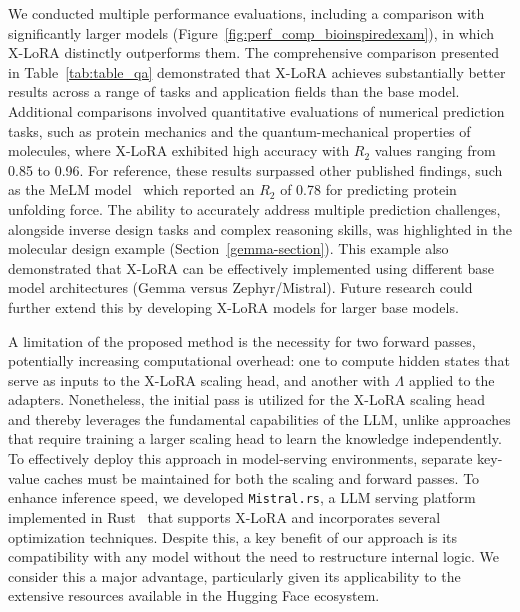 We conducted multiple performance evaluations, including a comparison with significantly larger models (Figure~\ref{fig:perf_comp_bioinspiredexam}), in which X-LoRA distinctly outperforms them. The comprehensive comparison presented in Table~\ref{tab:table_qa} demonstrated that X-LoRA achieves substantially better results across a range of tasks and application fields than the base model. Additional comparisons involved quantitative evaluations of numerical prediction tasks, such as protein mechanics and the quantum-mechanical properties of molecules, where X-LoRA exhibited high accuracy with $R_2$ values ranging from 0.85 to 0.96. For reference, these results surpassed other published findings, such as the MeLM model~\cite{Buehler2023MeLMProblemsb} which reported an $R_2$ of 0.78 for predicting protein unfolding force. The ability to accurately address multiple prediction challenges, alongside inverse design tasks and complex reasoning skills, was highlighted in the molecular design example (Section~\ref{gemma-section}). This example also demonstrated that X-LoRA can be effectively implemented using different base model architectures (Gemma versus Zephyr/Mistral). Future research could further extend this by developing X-LoRA models for larger base models.

A limitation of the proposed method is the necessity for two forward passes, potentially increasing computational overhead: one to compute hidden states that serve as inputs to the X-LoRA scaling head, and another with $\Lambda$ applied to the adapters. Nonetheless, the initial pass is utilized for the X-LoRA scaling head and thereby leverages the fundamental capabilities of the LLM, unlike approaches that require training a larger scaling head to learn the knowledge independently. To effectively deploy this approach in model-serving environments, separate key-value caches must be maintained for both the scaling and forward passes. To enhance inference speed, we developed \texttt{Mistral.rs}, a LLM serving platform implemented in Rust~\cite{matsakis2014rust} that supports X-LoRA and incorporates several optimization techniques. Despite this, a key benefit of our approach is its compatibility with any model without the need to restructure internal logic. We consider this a major advantage, particularly given its applicability to the extensive resources available in the Hugging Face ecosystem.

